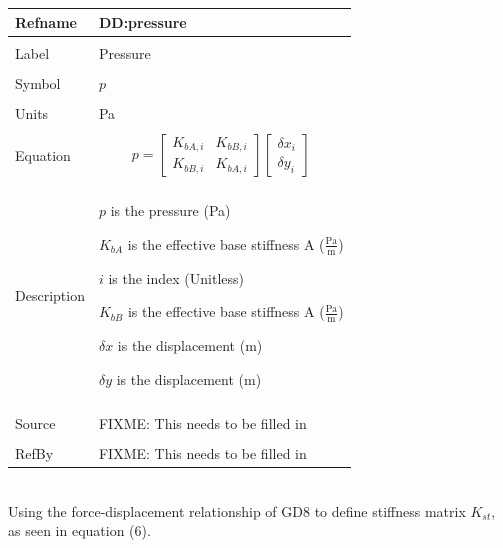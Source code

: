 \documentclass[12pt]{article}
\begin{document}
\noindent \begin{minipage}{\textwidth}
\begin{tabular}{p{} p{}}
\toprule \textbf{Refname} & \textbf{DD:pressure}
\label{DD:pressure}
\\ \midrule \\
Label & Pressure
\\ \midrule \\
Symbol & $p$
\\ \midrule \\
Units & Pa
\\ \midrule \\
Equation & \begin{dmath}
           p=\begin{bmatrix}
{K_{bA,i}} & {K_{bB,i}}\\
{K_{bB,i}} & {K_{bA,i}}
\end{bmatrix} \begin{bmatrix}
{δx}_{i}\\
{δy}_{i}
\end{bmatrix}
           \end{dmath}
\\ \midrule \\
Description & \begin{symbDescription}
              \item{$p$ is the pressure (Pa)}
              \item{${K_{bA}}$ is the effective base stiffness A ($\frac{\text{Pa}}{\text{m}}$)}
              \item{$i$ is the index (Unitless)}
              \item{${K_{bB}}$ is the effective base stiffness A ($\frac{\text{Pa}}{\text{m}}$)}
              \item{$δx$ is the displacement (m)}
              \item{$δy$ is the displacement (m)}
              \end{symbDescription}
\\ \midrule \\
Source & FIXME: This needs to be filled in
\\ \midrule \\
RefBy & FIXME: This needs to be filled in
\\ \bottomrule \end{tabular}
\end{minipage}\\
Using the force-displacement relationship of GD8 to define stiffness matrix ${K_{st}}$, as seen in equation (6).
\end{document}
